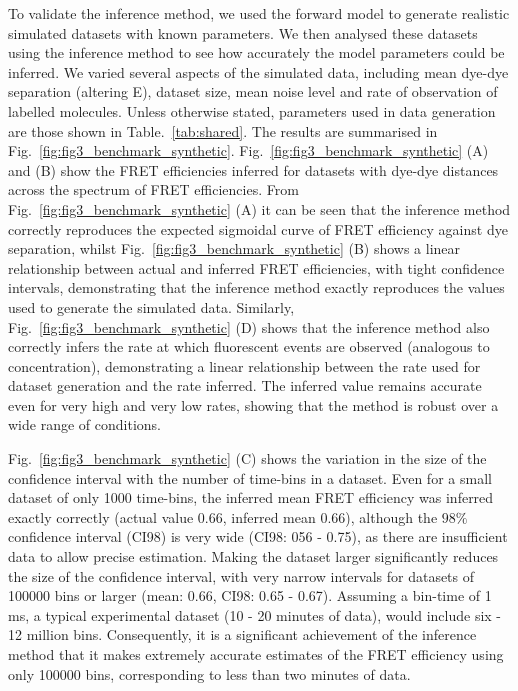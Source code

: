 To validate the inference method, we used the forward model to generate realistic simulated datasets with known parameters.  We then analysed these datasets using the inference method to see how accurately the model parameters could be inferred. We varied several aspects of the simulated data, including mean dye-dye separation (altering E), dataset size, mean noise level and rate of observation of labelled molecules.  Unless otherwise stated, parameters used in data generation are those shown in Table.~\ref{tab:shared}. The results are summarised in Fig.~\ref{fig:fig3_benchmark_synthetic}.  Fig.~\ref{fig:fig3_benchmark_synthetic} (A) and (B) show the FRET efficiencies inferred for datasets with dye-dye distances across the spectrum of FRET efficiencies.  From Fig.~\ref{fig:fig3_benchmark_synthetic} (A) it can be seen that the inference method correctly reproduces the expected sigmoidal curve of FRET efficiency against dye separation, whilst Fig.~\ref{fig:fig3_benchmark_synthetic} (B) shows a linear relationship between actual and inferred FRET efficiencies, with tight confidence intervals, demonstrating that the inference method exactly reproduces the values used to generate the simulated data.  Similarly, Fig.~\ref{fig:fig3_benchmark_synthetic} (D) shows that the inference method also correctly infers the rate at which fluorescent events are observed (analogous to concentration), demonstrating a linear relationship between the rate used for dataset generation and the rate inferred.  The inferred value remains accurate even for very high and very low rates, showing that the method is robust over a wide range of conditions. 

Fig.~\ref{fig:fig3_benchmark_synthetic} (C) shows the variation in the size of the confidence interval with the number of time-bins in a dataset.  Even for a small dataset of only 1000 time-bins, the inferred mean FRET efficiency was inferred exactly correctly (actual value 0.66, inferred mean 0.66), although the $98 \%$ confidence interval (CI98) is very wide (CI98: 056 - 0.75), as there are insufficient data to allow precise estimation. Making the dataset larger significantly reduces the size of the confidence interval, with very narrow intervals for datasets of 100000 bins or larger (mean: 0.66, CI98: 0.65 - 0.67). Assuming a bin-time of 1 ms, a typical experimental dataset (10 - 20 minutes of data), would include six - 12 million bins. Consequently, it is a significant achievement of the inference method that it makes extremely accurate estimates of the FRET efficiency using only 100000 bins, corresponding to less than two minutes of data. 

